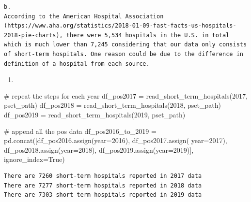 \documentclass[
  letterpaper,
  DIV=11,
  numbers=noendperiod]{scrartcl}
\newenvironment{Shaded}{\begin{snugshade}}{\end{snugshade}}
\newcommand{\CommentTok}[1]{\textcolor[rgb]{0.37,0.37,0.37}{#1}}
\newcommand{\DecValTok}[1]{\textcolor[rgb]{0.68,0.00,0.00}{#1}}
\newcommand{\NormalTok}[1]{\textcolor[rgb]{0.00,0.23,0.31}{#1}}
\newcommand{\OperatorTok}[1]{\textcolor[rgb]{0.37,0.37,0.37}{#1}}
\newcommand{\VariableTok}[1]{\textcolor[rgb]{0.07,0.07,0.07}{#1}}
\providecommand{\tightlist}{%
  \setlength{\itemsep}{0pt}\setlength{\parskip}{0pt}}\usepackage{longtable,booktabs,array}
\begin{document}
\begin{verbatim}
b.   
According to the American Hospital Association (https://www.aha.org/statistics/2018-01-09-fast-facts-us-hospitals-2018-pie-charts), there were 5,534 hospitals in the U.S. in total which is much lower than 7,245 considering that our data only consists of short-term hospitals. One reason could be due to the difference in definition of a hospital from each source.
\end{verbatim}

\begin{enumerate}
\def\labelenumi{\arabic{enumi}.}
\setcounter{enumi}{2}
\tightlist
\item
\end{enumerate}

\begin{Shaded}
\begin{Highlighting}[]
\CommentTok{\# repeat the steps for each year}
\NormalTok{df\_pos2017 }\OperatorTok{=}\NormalTok{ read\_short\_term\_hospitals(}\DecValTok{2017}\NormalTok{, pset\_path)}
\NormalTok{df\_pos2018 }\OperatorTok{=}\NormalTok{ read\_short\_term\_hospitals(}\DecValTok{2018}\NormalTok{, pset\_path)}
\NormalTok{df\_pos2019 }\OperatorTok{=}\NormalTok{ read\_short\_term\_hospitals(}\DecValTok{2019}\NormalTok{, pset\_path)}

\CommentTok{\# append all the pos data}
\NormalTok{df\_pos2016\_to\_2019 }\OperatorTok{=}\NormalTok{ pd.concat([df\_pos2016.assign(year}\OperatorTok{=}\DecValTok{2016}\NormalTok{), df\_pos2017.assign(}
\NormalTok{    year}\OperatorTok{=}\DecValTok{2017}\NormalTok{), df\_pos2018.assign(year}\OperatorTok{=}\DecValTok{2018}\NormalTok{), df\_pos2019.assign(year}\OperatorTok{=}\DecValTok{2019}\NormalTok{)], ignore\_index}\OperatorTok{=}\VariableTok{True}\NormalTok{)}
\end{Highlighting}
\end{Shaded}

\begin{verbatim}
There are 7260 short-term hospitals reported in 2017 data
There are 7277 short-term hospitals reported in 2018 data
There are 7303 short-term hospitals reported in 2019 data
\end{verbatim}
\end{document}

